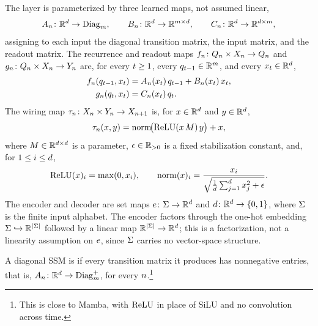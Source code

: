 \documentclass{article}
\begin{document}
The layer is parameterized by three learned maps, not assumed linear,
$$
A_n \colon \mathbb{R}^{d} \to \mathrm{Diag}_m, \qquad
B_n \colon \mathbb{R}^{d} \to \mathbb{R}^{m \times d}, \qquad
C_n \colon \mathbb{R}^{d} \to \mathbb{R}^{d \times m},
$$
assigning to each input the diagonal transition matrix, the input matrix, and the readout matrix.
The recurrence and readout maps $f_n \colon Q_n \times X_n \to Q_n$ and $g_n \colon Q_n \times X_n \to Y_n$ are, for every $t \ge 1$, every $q_{t-1} \in \mathbb{R}^{m}$, and every $x_t \in \mathbb{R}^{d}$,
\begin{align}
    f_n(q_{t-1}, x_t)
      &= A_n(x_t)\, q_{t-1} + B_n(x_t)\, x_t,
      \label{eq:ssm_recurrence}\\
    g_n(q_t, x_t)
      &= C_n(x_t)\, q_t.
      \label{eq:ssm_readout}
\end{align}
The wiring map $\tau_n \colon X_n \times Y_n \to X_{n+1}$ is, for $x \in \mathbb{R}^{d}$ and $y \in \mathbb{R}^{d}$,
$$
\tau_n(x, y) = \mathrm{norm}\!\bigl( \mathrm{ReLU}(x\, M)\, y \bigr) + x,
$$
where $M \in \mathbb{R}^{d \times d}$ is a parameter, $\epsilon \in \mathbb{R}_{>0}$ is a fixed stabilization constant, and, for $1 \le i \le d$,
$$
\mathrm{ReLU}(x)_i = \max(0, x_i), \qquad
\mathrm{norm}(x)_i = \frac{x_i}{\sqrt{\tfrac{1}{d}\sum_{j=1}^{d} x_j^2 + \epsilon}}.
$$
The encoder and decoder are set maps $e \colon \Sigma \to \mathbb{R}^{d}$ and $d \colon \mathbb{R}^{d} \to \{0, 1\}$, where $\Sigma$ is the finite input alphabet.
The encoder factors through the one-hot embedding $\Sigma \hookrightarrow \mathbb{R}^{|\Sigma|}$ followed by a linear map $\mathbb{R}^{|\Sigma|} \to \mathbb{R}^{d}$; this is a factorization, not a linearity assumption on $e$, since $\Sigma$ carries no vector-space structure.

\begin{definition}\label{def:nonnegative}
A diagonal SSM is  if every transition matrix it produces has nonnegative entries, that is, $A_n \colon \mathbb{R}^{d} \to \mathrm{Diag}_m^+$,  for every $n$.\footnote{This is close to Mamba, with $\mathrm{ReLU}$ in place of SiLU and no convolution across time.}
\end{definition}
\end{document}
